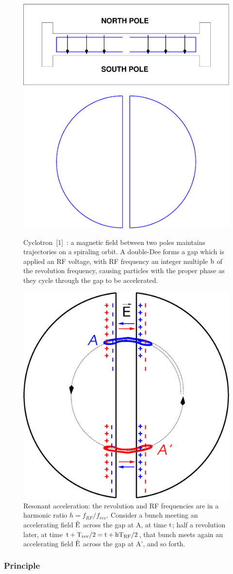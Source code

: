 \begin{figure}[ht]
\centering
\sidebyside
{
    \includegraphics[width=0.45\linewidth]{./figs_cyclo/deesAndPoles.eps}
    \caption{\label{FigLBLCycloSketch}
Cyclotron~[1]~: a magnetic field between 
two poles maintains trajectories on a spiraling orbit. A double-Dee  forms a gap which is applied an RF voltage, 
with RF frequency an integer multiple $\rm h$ of the revolution frequency, 
 causing particles with the proper phase as they cycle through the gap to be accelerated.} %
}{
    \includegraphics[width=0.38\linewidth]{./figs_cyclo/dees.eps}
    \caption{  \label{FigPSICyclo}
Resonant acceleration: 
the revolution and RF frequencies are in a harmonic ratio $h= f_{RF} / f_{rev} $. 
Consider a bunch meeting an accelerating field $\rm \vec E$ across the gap at A, at time $\rm t$;
half a revolution later, at time  $\rm t +T_{rev}/2 = t + h T_{RF}/2$,  that bunch meets again 
an accelerating field $\rm \vec E$ across the gap at A', and so forth. 
}
}
\end{figure}

\subsubsection*{Principle}

